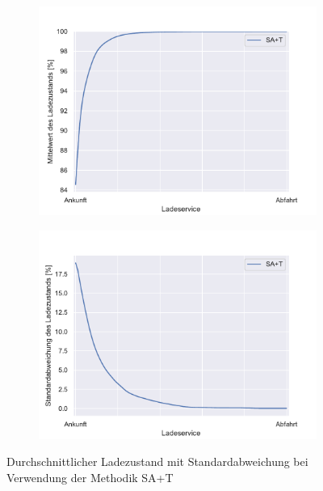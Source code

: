 \begin{figure}
	\begin{subfigure}{0.49\linewidth}
		\includegraphics[width=\linewidth]{img/SA_par/SlottedAloha_participants_VDE_tau_10_soc_mean.pdf}
        \label{ABB_SAparSocMEAN}
	\end{subfigure}
	\begin{subfigure}{0.49\linewidth}
		\includegraphics[width=\linewidth]{img/SA_par/SlottedAloha_participants_VDE_tau_10_soc_std.pdf}
        \label{ABB_SAparSocSTD}
	\end{subfigure}
	\caption{Durchschnittlicher Ladezustand mit Standardabweichung bei Verwendung der Methodik SA+T}
\end{figure}
